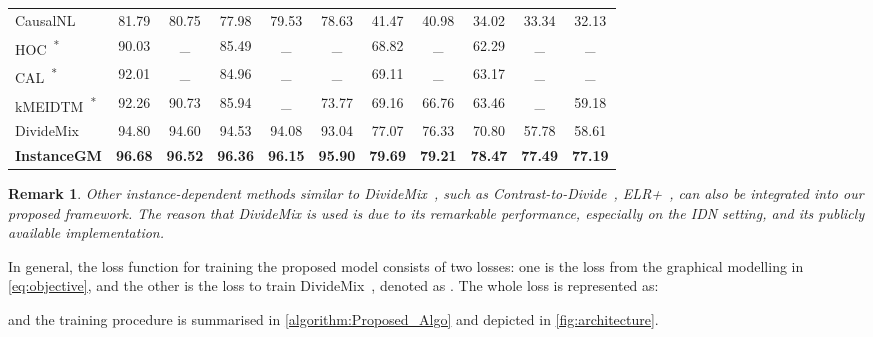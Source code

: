 \documentclass[10pt,twocolumn,letterpaper]{article}
\newtheorem{remark}{Remark}
\begin{document}
\begin{table*}[htbp!]
\begin{tabular}{l c c c c c c c c c c}
        CausalNL~\cite{yao2021instance} & 81.79 & 80.75 & 77.98 & 79.53 & 78.63 & 41.47 & 40.98 & 34.02 & 33.34 & 32.13\\
        HOC~\cite{zhu2021clusterability}\textsuperscript{*} & 90.03 & \_ & 85.49 & \_ & \_ & 68.82 & \_ & 62.29 & \_ & \_\\
        CAL~\cite{Zhu_2021_CVPR}\textsuperscript{*} & 92.01 & \_ & 84.96 & \_ & \_ & 69.11 & \_ & 63.17 & \_ & \_\\
        kMEIDTM~\cite{cheng2022instance}\textsuperscript{*} & 92.26 & 90.73 & 85.94 & \_ & 73.77 & 69.16 & 66.76 & 63.46 & \_ & 59.18\\
        DivideMix~\cite{li2020dividemix} & 94.80  & 94.60 & 94.53 & 94.08  & 93.04 & 77.07 & 76.33 & 70.80 & 57.78  & 58.61\\
        \midrule
        \rowcolor{Gray!25} \textbf{InstanceGM}  & \textbf{96.68} & \textbf{96.52} & \textbf{96.36} & \textbf{96.15}  & \textbf{95.90} & \textbf{79.69} & \textbf{79.21} & \textbf{78.47} & \textbf{77.49}  & \textbf{77.19}\\
        \bottomrule
        \end{tabular}
        \vspace{-1em}
    \end{table*} 

    \begin{remark}
        Other instance-dependent methods similar to DivideMix~\cite{li2020dividemix}, such as Contrast-to-Divide~\cite{zheltonozhskii2022contrast}, ELR+~\cite{liu2020early}, can also be integrated into our proposed framework. The reason that DivideMix is used is due to its remarkable performance, especially on the IDN setting, and its publicly available implementation.
    \end{remark}

    In general, the loss function for training the proposed model consists of two losses: one is the loss  from the graphical modelling in \eqref{eq:objective}, and the other is the loss to train DivideMix~\cite[Eq. (12)]{li2020dividemix}, denoted as . The whole loss is represented as:
    
    and the training procedure is summarised in \cref{algorithm:Proposed_Algo} and depicted in \cref{fig:architecture}.
    
\end{document}

